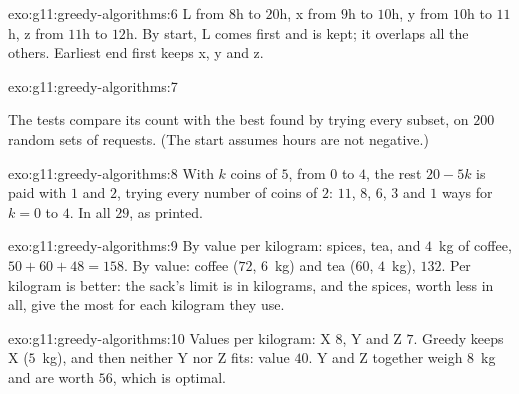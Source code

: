 \begin{solution}{exo:g11:greedy-algorithms:6}
L from $8$h to $20$h, x from $9$h to $10$h, y from $10$h to $11$h, z from $11$h to $12$h. By start, L comes first and
is kept; it overlaps all the others. Earliest end first keeps x, y and z.
\end{solution}

\begin{solution}{exo:g11:greedy-algorithms:7}
\smallskip\noindent\hspace*{2em}

\noindent\hspace*{4em}

\noindent\hspace*{4em}

\noindent\hspace*{6em}

\noindent\hspace*{8em}

\noindent\hspace*{8em}

\noindent\hspace*{4em}

\smallskip\noindent The tests compare its count with the best found by trying every subset, on $200$ random sets of
requests. (The  start assumes hours are not negative.)
\end{solution}

\begin{solution}{exo:g11:greedy-algorithms:8}
With $k$ coins of $5$, from $0$ to $4$, the rest $20 - 5k$ is paid with $1$ and $2$, trying every number of coins of
$2$: $11$, $8$, $6$, $3$ and $1$ ways for $k = 0$ to $4$. In all $29$, as printed.
\end{solution}

\begin{solution}{exo:g11:greedy-algorithms:9}
By value per kilogram: spices, tea, and $4$~kg of coffee, $50 + 60 + 48 = 158$. By value: coffee ($72$, $6$~kg) and
tea ($60$, $4$~kg), $132$. Per kilogram is better: the sack's limit is in kilograms, and the spices, worth less in all,
give the most for each kilogram they use.
\end{solution}

\begin{solution}{exo:g11:greedy-algorithms:10}
Values per kilogram: X $8$, Y and Z $7$. Greedy keeps X ($5$~kg), and then neither Y nor Z fits: value $40$. Y and Z
together weigh $8$~kg and are worth $56$, which is optimal.
\end{solution}

